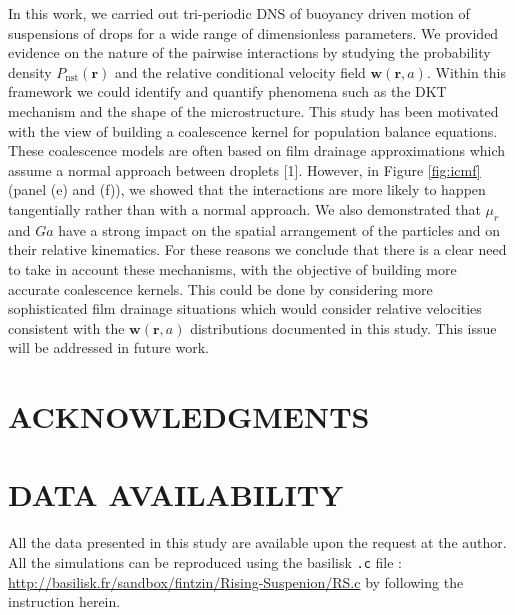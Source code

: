 In this work, we carried out tri-periodic DNS of buoyancy driven motion of suspensions of drops for a wide range of dimensionless parameters. 
We provided evidence on the nature of the pairwise interactions by studying the probability density $P_\text{nst}(\textbf{r})$ and the relative conditional velocity field $\textbf{w}(\textbf{r},a)$. 
Within this framework  we could identify and quantify phenomena such as the DKT mechanism and the shape of the microstructure. 
This study has been motivated with the view of building a coalescence kernel for population balance equations. 
These coalescence models are often based on film drainage approximations which assume a normal approach between droplets [1].  
However, in Figure \ref{fig:icmf} (panel (e) and (f)), we showed that the interactions are more likely to happen tangentially rather than with a normal approach. 
We also demonstrated that $\mu_r$ and $Ga$ have a strong impact on the spatial arrangement of the particles and on their relative kinematics. 
For these reasons we conclude that there is a clear need to take in account these mechanisms, with the objective of building more accurate coalescence kernels. 
This could be done by considering more sophisticated film drainage situations which would consider relative velocities consistent with the $\textbf{w}(\textbf{r},a)$ distributions documented in this study.
This issue will be addressed in future work.  


\section*{ACKNOWLEDGMENTS}

\section*{DATA AVAILABILITY}

All the data presented in this study are available upon the request at the author. 
All the simulations can be reproduced using the basilisk \texttt{.c} file : \url{http://basilisk.fr/sandbox/fintzin/Rising-Suspenion/RS.c} by following the instruction herein. 